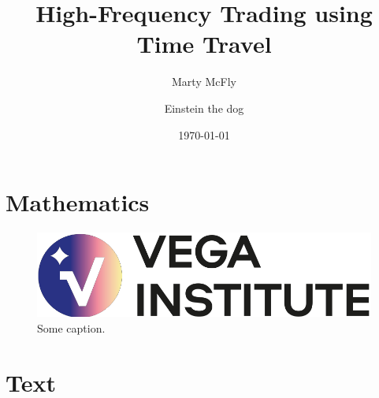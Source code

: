 \documentclass[
]{vegaarticle}
\title{High-Frequency Trading using Time Travel}
\author[1]{Marty McFly}
\affil[1]{University of Time Travel}
\author[2]{Einstein the dog}
\affil[2]{University of Time Travel}
\date{\today}
\begin{document}
    \maketitle	
    \begin{abstract}
        \blindtext
        \blindtext
    \end{abstract}  
    
    \introduction 
    
    \blindtext

    \blindrandomtrue

    \blindmathtrue

    \section{Mathematics}
    \blindmathpaper
    \begin{figure}[htp]
		\centering
		\includegraphics[width=.4\textwidth]{vega_logo_smaller.png}
		\caption{Some caption.}
	\end{figure}

    \section{Text}
    \Blinddescription

    \blindmathfalse
    \conclusion
    \Blindenumerate

\end{document}
